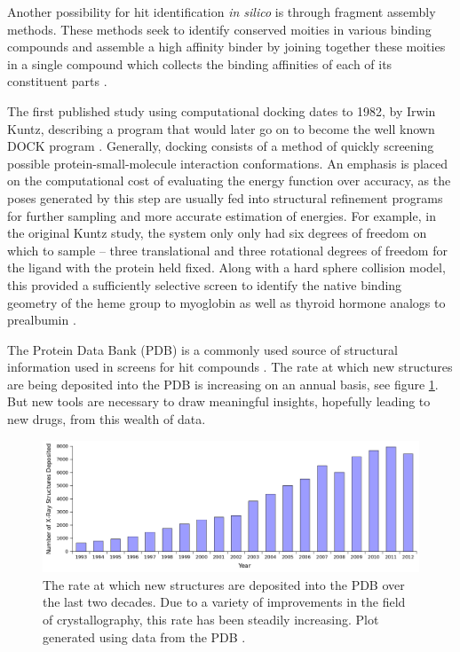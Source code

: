 Another possibility for hit identification {\it in silico} is through fragment assembly methods.
These methods seek to identify conserved moities in various binding compounds and assemble a high affinity binder by joining together these moities in a single compound which collects the binding affinities of each of its constituent parts \cite{jorgensen2006computer,jorgensen2004many,jorgensen2009efficient}.

The first published study using computational docking dates to 1982, by Irwin Kuntz, describing a program that would later go on to become the well known DOCK program \cite{kuntz1982geometric}.
Generally, docking consists of a method of quickly screening possible protein-small-molecule interaction conformations.
An emphasis is placed on the computational cost of evaluating the energy function over accuracy, as the poses generated by this step are usually fed into structural refinement programs for further sampling and more accurate estimation of energies.
For example, in the original Kuntz study, the system only only had six degrees of freedom on which to sample -- three translational and three rotational degrees of freedom for the ligand with the protein held fixed.
Along with a hard sphere collision model, this provided a sufficiently selective screen to identify the native binding geometry of the heme group to myoglobin as well as thyroid hormone analogs to prealbumin \cite{kuntz1982geometric}.

The Protein Data Bank (PDB) is a commonly used source of structural information used in screens for hit compounds \cite{abola1984protein}. 
The rate at which new structures are being deposited into the PDB is increasing on an annual basis, see figure \ref{figure:pdb_growth}.
But new tools are necessary to draw meaningful insights, hopefully leading to new drugs, from this wealth of data.
\begin{figure}[H]
\begin{center}
\includegraphics[width=\textwidth]{figures/pdb_deposit_rate.png}
\caption{The rate at which new structures are deposited into the PDB over the last two decades.
Due to a variety of improvements in the field of crystallography, this rate has been steadily increasing.
Plot generated using data from the PDB \protect\cite{berman2003announcing,berman2000protein}.}
\label{figure:pdb_growth}
\end{center}
\end{figure}

